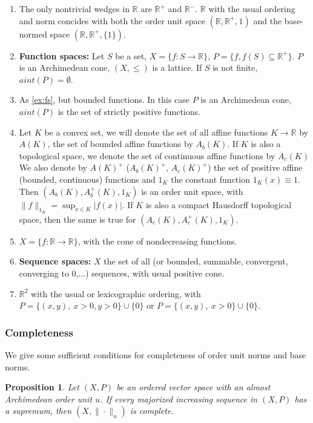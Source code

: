 \documentclass[12pt]{article}
\newtheorem{prop}{Proposition}
\theoremstyle{remark}
\newcommand{\<}{\langle}
\begin{document}
\begin{enumerate}
\item The only nontrivial wedges in $\mathbb R$ are $\mathbb R^+$ and $\mathbb R^{-}$. $\mathbb R$ with the usual ordering and norm 
 concides with both the order unit space $(\mathbb R,\mathbb R^+,1)$ and the base-normed space $(\mathbb R,\mathbb R^+,\{1\})$.
\item \label{ex:fs}\textbf{Function spaces:} Let $S$ be a set, $X=\{f:S\to \mathbb R\}$, $P=\{f, f(S)\subseteq \mathbb R^+\}$. $P$ is an Archimedean cone, $(X,\le)$ is a lattice. If $S$ is not finite, $aint(P)=\emptyset$.
\item  \label{ex:fsb} As \ref{ex:fs}, but bounded functions.  In this case $P$ is an Archimedean cone, $aint(P)$ is the set of strictly positive functions.
\item \label{ex:affine} Let  $K$ be a convex set, we will denote the set of all affine functions $K\to \mathbb R$ by $A(K)$, 
the set of bounded affine functions by $A_b(K)$.  If $K$ is also a topological space, we denote the set of continuous affine functions by $A_c(K)$
 We also denote by $A(K)^+$ ($A_b(K)^+$, $A_c(K)^+$) the set of positive affine (bounded, continuous) functions and $1_K$ the constant function $1_K(x)\equiv 1$. Then $(A_{b}(K),A_{b}^+(K),1_K)$ is an order unit space, with $\|f\|_{1_K}=\sup_{x\in K}|f(x)|$. If 
  $K$ is also a compact Hausdorff topological space, then the same is true for $(A_{c}(K),A_{c}^+(K),1_K)$.
 \item $X=\{f:\mathbb R\to \mathbb R\} $, with the cone of nondecreasing functions.
\item \textbf{Sequence spaces:} $X$ the set of all  (or bounded, summable, convergent, converging to 0,...) sequences, with usual positive cone.
\item $\mathbb R^2$ with the usual or lexicographic ordering, with $P=\{(x,y),\ x>0, y>0\}\cup \{0\}$ or $P=\{(x,y),\ x>0\}\cup \{0\}$.
\end{enumerate}



\subsubsection*{Completeness}

We give some sufficient conditions for completeness of order unit norms and base norms.

\begin{prop}\cite{jameson} Let $(X,P)$ be an ordered vector space with an almost Archimedean order unit $u$. If every majorized increasing sequence in $(X,P)$ has a supremum, then $(X,\|\cdot\|_u)$ is complete.


\end{prop}
\end{document}
